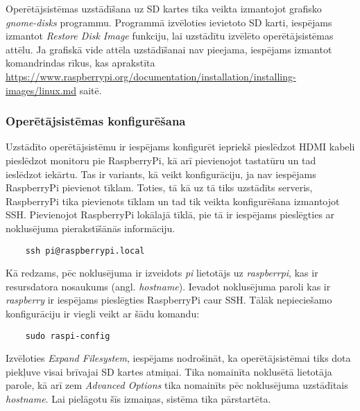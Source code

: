 Operētājsistēmas uzstādīšana uz SD kartes tika veikta izmantojot grafisko \textit{gnome-disks} programmu. Programmā izvēloties ievietoto SD karti, iespējams izmantot \textit{Restore Disk Image} funkciju, lai uzstādītu izvēlēto operētājsistēmas attēlu.
Ja grafiskā vide attēla uzstādīšanai nav pieejama, iespējams izmantot komandrindas rīkus, kas aprakstīta \url{https://www.raspberrypi.org/documentation/installation/installing-images/linux.md} saitē.

\subsubsection{Operētājsistēmas konfigurēšana}
Uzstādīto operētājsistēmu ir iespējams konfigurēt iepriekš pieslēdzot HDMI kabeli pieslēdzot monitoru pie RaspberryPi, kā arī pievienojot tastatūru un tad ieslēdzot iekārtu. Tas ir variants, kā veikt konfigurāciju, ja nav iespējams RaspberryPi pievienot tīklam. Toties, tā kā uz tā tiks uzstādīts serveris, RaspberryPi tika pievienots tīklam un tad tik veikta konfigurēšana izmantojot SSH.
Pievienojot RaspberryPi lokālajā tīklā, pie tā ir iespējams pieslēgties ar noklusējuma pierakstīšānās informāciju.
\begin{lstlisting}
	ssh pi@raspberrypi.local
\end{lstlisting}
Kā redzams, pēc noklusējuma ir izveidots \textit{pi} lietotājs uz \textit{raspberrpi}, kas ir resursdatora nosaukums (angl. \textit{hostname}). Ievadot noklusējuma paroli kas ir \textit{raspberry} ir iespējams pieslēgties RaspberryPi caur SSH.
Tālāk nepieciešamo konfigurāciju ir viegli veikt ar šādu komandu:
\begin{lstlisting}
	sudo raspi-config
\end{lstlisting}
Izvēloties \textit{Expand Filesystem}, iespējams nodrošināt, ka operētājsistēmai tiks dota piekļuve visai brīvajai SD kartes atmiņai. Tika nomainīta noklusētā lietotāja parole, kā arī zem \textit{Advanced Options} tika nomainīts pēc noklusējuma uzstādītais \textit{hostname}.
Lai pielāgotu šīs izmaiņas, sistēma tika pārstartēta.

